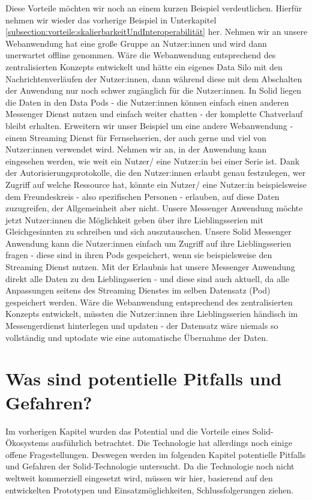 \documentclass[acmtog]{acmart}
\begin{document}
Diese Vorteile möchten wir noch an einem kurzen Beispiel verdeutlichen. Hierfür nehmen wir wieder das vorherige Beispiel in Unterkapitel \ref{subsection:vorteile:skalierbarkeitUndInteroperabilität} her. 
Nehmen wir an unsere Webanwendung hat eine große Gruppe an Nutzer:innen und wird dann unerwartet offline genommen. Wäre die Webanwendung entsprechend des zentralisierten Konzepts entwickelt und hätte ein eigenes Data Silo mit den Nachrichtenverläufen der Nutzer:innen, dann während diese mit dem Abschalten der Anwendung nur noch schwer zugänglich für die Nutzer:innen. In Solid liegen die Daten in den Data Pods - die Nutzer:innen können einfach einen anderen Messenger Dienst nutzen und einfach weiter chatten - der komplette Chatverlauf bleibt erhalten.
Erweitern wir unser Beispiel um eine andere Webanwendung - einem Streaming Dienst für Fernsehserien, der auch gerne und viel von Nutzer:innen verwendet wird. Nehmen wir an, in der Anwendung kann eingesehen werden, wie weit ein Nutzer/ eine Nutzer:in bei einer Serie ist. Dank der Autorisierungsprotokolle, die den Nutzer:innen erlaubt genau festzulegen, wer Zugriff auf welche Ressource hat, könnte ein Nutzer/ eine Nutzer:in beispielsweise dem Freundeskreis - also spezifischen Personen - erlauben, auf diese Daten zuzugreifen, der Allgemeinheit aber nicht. 
Unsere Messenger Anwendung möchte jetzt Nutzer:innen die Möglichkeit geben über ihre Lieblingsserien mit Gleichgesinnten zu schreiben und sich auszutauschen. Unsere Solid Messenger Anwendung kann die Nutzer:innen einfach um Zugriff auf ihre Lieblingsserien fragen - diese sind in ihren Pods gespeichert, wenn sie beispielsweise den Streaming Dienst nutzen. Mit der Erlaubnis hat unsere Messenger Anwendung direkt alle Daten zu den Lieblingsserien - und diese sind auch aktuell, da alle Anpassungen seitens des Streaming Dienstes im selben Datensatz (Pod) gespeichert werden. Wäre die Webanwendung entsprechend des zentralisierten Konzepts entwickelt, müssten die Nutzer:innen ihre Lieblingsserien händisch im Messengerdienst hinterlegen und updaten - der Datensatz wäre niemals so vollständig und uptodate wie eine automatische Übernahme der Daten.

\label{section:wasSindPotentiellePitfallsUndGefahren}
\section{Was sind potentielle Pitfalls und Gefahren?}

Im vorherigen Kapitel wurden das Potential und die Vorteile eines Solid-Ökosystems ausführlich betrachtet. Die Technologie hat allerdings noch einige offene Fragestellungen. Deswegen werden im folgenden Kapitel potentielle Pitfalls und Gefahren der Solid-Technologie untersucht. Da die Technologie noch nicht weltweit kommerziell eingesetzt wird, müssen wir hier, basierend auf den entwickelten Prototypen und Einsatzmöglichkeiten, Schlussfolgerungen ziehen.
\end{document}
